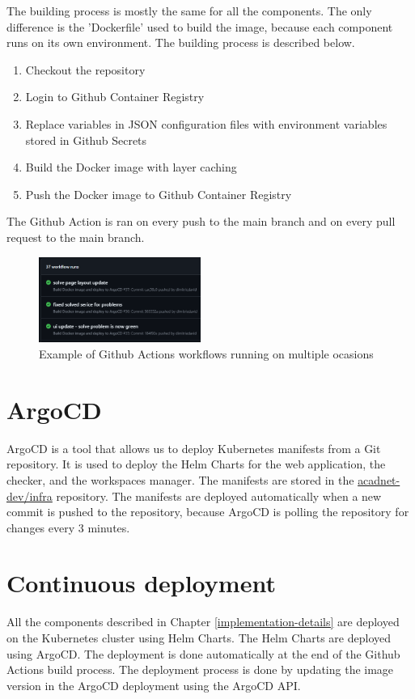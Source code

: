 \documentclass[12pt,a4paper]{report}
\begin{document}
The building process is mostly the same for all the components. The only difference is the 'Dockerfile' used to build the image, because each component runs on its own environment. The building process is described below.

\begin{enumerate}
	\item Checkout the repository
	\item Login to Github Container Registry
	\item Replace variables in JSON configuration files with environment variables stored in Github Secrets
	\item Build the Docker image with layer caching
	\item Push the Docker image to Github Container Registry
\end{enumerate}

The Github Action is ran on every push to the main branch and on every pull request to the main branch.

\begin{figure}[h]
	\centering
	\includegraphics[width=200px]{./pics/github-actions-workflows.png}
	\caption{Example of Github Actions workflows running on multiple ocasions}
	\label{fig:github-actions-workflows}
\end{figure}

\section{ArgoCD}
ArgoCD is a tool that allows us to deploy Kubernetes manifests from a Git repository. It is used to deploy the Helm Charts for the web application, the checker, and the workspaces manager. The manifests are stored in the \href{https://github.com/acadnet-dev/infra}{acadnet-dev/infra} repository. The manifests are deployed automatically when a new commit is pushed to the repository, because ArgoCD is polling the repository for changes every 3 minutes.


\section{Continuous deployment}
All the components described in Chapter \ref{implementation-details} are deployed on the Kubernetes cluster using Helm Charts. The Helm Charts are deployed using ArgoCD. The deployment is done automatically at the end of the Github Actions build process. The deployment process is done by updating the image version in the ArgoCD deployment using the ArgoCD API.
\end{document}
